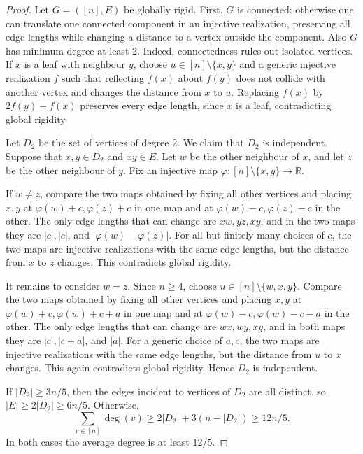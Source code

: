 \documentclass[fullpage,11pt]{article}
\theoremstyle{break}
\theoremstyle{definition}
\theoremstyle{break}
\begin{document}
\begin{proof}
    Let $G=([n],E)$ be globally rigid. First, \(G\) is connected: otherwise
    one can translate one connected component in an injective realization,
    preserving all edge lengths while changing a distance to a vertex outside
    the component. Also \(G\) has minimum degree at least \(2\). Indeed,
    connectedness rules out isolated vertices. If \(x\) is a leaf with
    neighbour \(y\), choose \(u\in[n]\setminus\{x,y\}\) and a generic
    injective realization \(f\) such that reflecting \(f(x)\) about \(f(y)\)
    does not collide with another vertex and changes the distance from \(x\)
    to \(u\). Replacing \(f(x)\) by \(2f(y)-f(x)\) preserves every edge
    length, since \(x\) is a leaf, contradicting global rigidity.

    Let $D_2$ be the set of vertices of degree $2$. We claim that $D_2$ is
    independent. Suppose that \(x,y\in D_2\) and \(xy\in E\). Let \(w\) be
    the other neighbour of \(x\), and let \(z\) be the other neighbour of
    \(y\). Fix an injective map
    \(\varphi\colon[n]\setminus\{x,y\}\to\mathbb R\).

    If \(w\neq z\), compare the two maps obtained by fixing all other
    vertices and placing \(x,y\) at
    \(\varphi(w)+c,\varphi(z)+c\) in one map and at
    \(\varphi(w)-c,\varphi(z)-c\) in the other. The only edge lengths that
    can change are \(xw,yz,xy\), and in the two maps they are
    \(|c|,|c|\), and \(|\varphi(w)-\varphi(z)|\). For all but finitely many
    choices of \(c\), the two maps are injective realizations with the same
    edge lengths, but the distance from \(x\) to \(z\) changes. This
    contradicts global rigidity.

    It remains to consider \(w=z\). Since \(n\ge4\), choose
    \(u\in[n]\setminus\{w,x,y\}\). Compare the two maps obtained by fixing
    all other vertices and placing \(x,y\) at
    \(\varphi(w)+c,\varphi(w)+c+a\) in one map and at
    \(\varphi(w)-c,\varphi(w)-c-a\) in the other. The only edge lengths that
    can change are \(wx,wy,xy\), and in both maps they are
    \(|c|,|c+a|\), and \(|a|\). For a generic choice of \(a,c\), the two
    maps are injective realizations with the same edge lengths, but the
    distance from \(u\) to \(x\) changes. This again contradicts global
    rigidity. Hence \(D_2\) is independent.

    If $|D_2| \geq 3n/5$, then the edges incident to vertices of $D_2$ are all distinct, so $|E|\geq 2|D_2|\geq 6n/5$. Otherwise,
    \[
        \sum_{v\in [n]}\deg(v)\geq 2|D_2|+3(n-|D_2|)\geq 12n/5.
    \]
    In both cases the average degree is at least $12/5$.
\end{proof}
\end{document}
